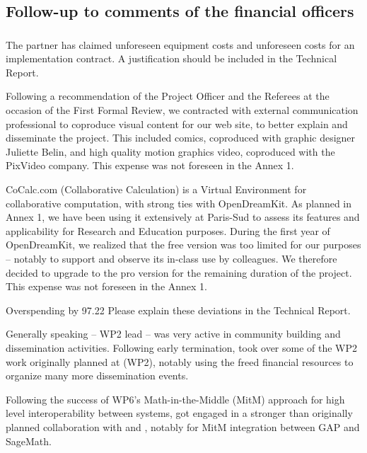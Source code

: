 \subsection{Follow-up to comments of the financial officers}

\subsubsection{}

\begin{EUcomment}
  The partner has claimed unforeseen equipment costs and unforeseen
  costs for an implementation contract. A justification should be
  included in the Technical Report.
\end{EUcomment}

Following a recommendation of the Project Officer and the Referees at
the occasion of the First Formal Review, we contracted with external
communication professional to coproduce visual content for our web
site, to better explain and disseminate the project. This included
comics, coproduced with graphic designer Juliette Belin, and high
quality motion graphics video, coproduced with the PixVideo company.
This expense was not foreseen in the Annex 1.

CoCalc.com (Collaborative Calculation) is a Virtual Environment for
collaborative computation, with strong ties with OpenDreamKit. As
planned in Annex 1, we have been using it extensively at Paris-Sud to
assess its features and applicability for Research and Education
purposes. During the first year of OpenDreamKit, we realized that the
free version was too limited for our purposes -- notably to support
and observe its in-class use by colleagues. We therefore decided to
upgrade to the pro version for the remaining duration of the project.
This expense was not foreseen in the Annex 1.

\begin{EUcomment}
  Overspending by 97.22%
  Please explain these deviations in the Technical Report.
\end{EUcomment}
Generally speaking  -- WP2 lead -- was very active in
community building and dissemination activities. Following
 early termination,  took over some of the WP2
work originally planned at  (WP2), notably using the freed
financial resources to organize many more dissemination events.

Following the success of WP6's Math-in-the-Middle (MitM) approach for
high level interoperability between systems,  got engaged in
a stronger than originally planned collaboration with  and
, notably for MitM integration between GAP and SageMath.

